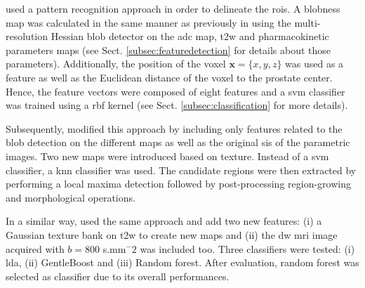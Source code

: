 \cite{Litjens2011} used a pattern recognition approach in order to delineate the \acp{roi}. A blobness map was calculated in the same manner as previously in \cite{Vos2010} using the multi-resolution Hessian blob detector on the \ac{adc} map, \ac{t2w} and pharmacokinetic parameters maps (see Sect. \ref{subsec:featuredetection} for details about those parameters). Additionally, the position of the voxel $\mathbf{x}=\{x,y,z\}$ was used as a feature as well as the Euclidean distance of the voxel to the prostate center. Hence, the feature vectors were composed of eight features and a \ac{svm} classifier was trained using a \ac{rbf} kernel (see Sect. \ref{subsec:classification} for more details).

Subsequently, \cite{Litjens2012} modified this approach by including only features related to the blob detection on the different maps as well as the original \acp{si} of the parametric images. Two new maps were introduced based on texture. Instead of a \ac{svm} classifier, a \ac{knn} classifier was used. The candidate regions were then extracted by performing a local maxima detection followed by post-processing region-growing and morphological operations. 

In a similar way, \cite{Litjens2014} used the same approach and add two new features: (i) a Gaussian texture bank on \ac{t2w} to create new maps and (ii) the \ac{dw} \ac{mri} image acquired with $b=800$ s.mm$^-2$ was included too. Three classifiers were tested: (i) \ac{lda}, (ii) GentleBoost and (iii) Random forest. After evaluation, random forest was selected as classifier due to its overall performances.